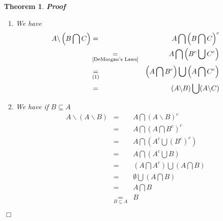 \documentclass{book}
\newcommand{\equallim}{\mathop{=}\limits}
\newcommand{\tmop}[1]{\ensuremath{\operatorname{#1}}}
\newenvironment{proof}{\noindent\textbf{Proof\ }}{\hspace*{\fill}$\Box$\medskip}
\newtheorem{theorem}{Theorem}
\begin{document}
{{\begin{theorem}
\begin{proof}
\begin{enumerate}
\begin{eqnarray*}
        A\backslash \left( B \bigcup C \right) & \equallim_{\tmop{definition}
        \tmop{of} \backslash} & A \bigcap \left( B \bigcup C \right)^c\\
        & \equallim_{\text{\ref{DeMorgan's Laws}}} & A \bigcap \left( B^c
        \bigcap C^c \right)\\
        & = & \left( A \bigcap A \right) \bigcap \left( B^c \bigcap C^c
        \right)\\
        & \equallim_{\text{\ref{associative laws of union and intersection}}}
        & \left( A \bigcap \left( B^c \bigcap C^c \right) \right) \bigcap A\\
        & \equallim_{\text{\ref{associative laws of union and intersection}}}
        & \left( \left( A \bigcap B^c \right) \bigcap C^c \right) \bigcap A\\
        & \equallim_{\text{\ref{associative laws of union and intersection}}}
        & \left( A \bigcap B^c \right) \bigcap \left( C^c \bigcap A \right)\\
        & \equallim_{\text{\ref{commutative laws of union and intersection}}}
        & \left( A \bigcap B^c \right) \bigcap \left( A \bigcap C^c \right)\\
        & = & (A\backslash B) \bigcap (A\backslash C)
      \end{eqnarray*}
      \item We have
      \begin{eqnarray*}
        A\backslash \left( B \bigcap C \right) & = & A \bigcap \left( B
        \bigcap C \right)^c\\
        & \equallim_{\text{\ref{DeMorgan's Laws}}} & A \bigcap \left( B^c
        \bigcup C^c \right)\\
        & \equallim_{(1)} & \left( A \bigcap B^c \right) \bigcup \left( A
        \bigcap C^c \right)\\
        & = & (A\backslash B) \bigcup (A\backslash C)
      \end{eqnarray*}
      \item We have if $B \subseteq A$
      \begin{eqnarray*}
        A\backslash (A\backslash B) & = & A \bigcap (A\backslash B)^c\\
        & = & A \bigcap \left( A \bigcap B^c \right)^c\\
        & = & A \bigcap \left( A^c \bigcup (B^c)^c \right)\\
        & = & A \bigcap \left( A^c \bigcup B \right)\\
        & = & \left( A \bigcap A^c \right) \bigcup \left( A \bigcap B
        \right)\\
        & = & \emptyset \bigcup \left( A \bigcap B \right)\\
        & = & A \bigcap B\\
        & \equallim_{B \subseteq A} & B
      \end{eqnarray*}
    \end{enumerate}
  \end{proof}
\end{theorem}

}}
\end{document}
